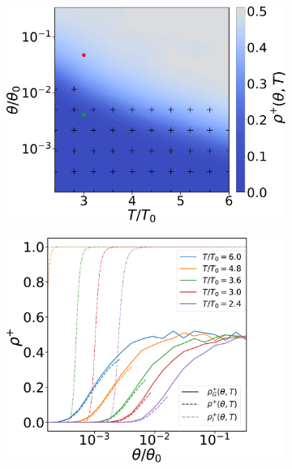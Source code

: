 \begin{figure}
    \begin{subfigure}[b]{0.495\textwidth}  
        \centering 
        \includegraphics[width=\textwidth]{figs_part1/mcmc/switch_channel_rates}
        \caption[]%
        {}    
        \label{fig:switch channel rates}
    \end{subfigure}
    \hfill
    \begin{subfigure}[b]{0.475\textwidth}
        \centering
        \includegraphics[width=\textwidth]{figs_part1/mcmc/switch_channel_rates_line_plot}
        \caption[]%
        {}    
        \label{fig:switch line plots}
    \end{subfigure}     


\end{figure}
